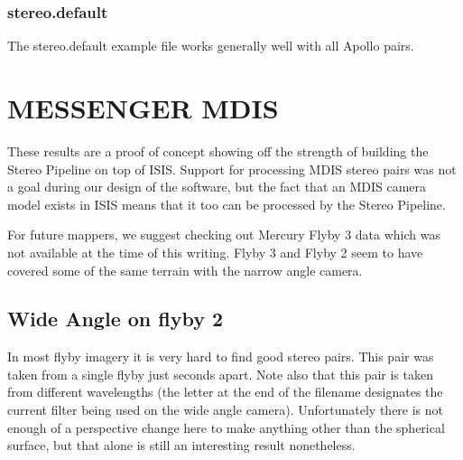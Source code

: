\subsubsection*{stereo.default}

The stereo.default example file works generally well with all Apollo pairs.

\pagebreak

\section{MESSENGER MDIS}

These results are a proof of concept showing off the strength of
building the Stereo Pipeline on top of \ac{ISIS}. Support for processing
MDIS stereo pairs was not a goal during our design of the software,
but the fact that an MDIS camera model exists in ISIS means that
it too can be processed by the Stereo Pipeline.

For future mappers, we suggest checking out Mercury Flyby 3 data which
was not available at the time of this writing. Flyby 3 and Flyby 2
seem to have covered some of the same terrain with the narrow angle
camera.

\subsection{Wide Angle on flyby 2}

In most flyby imagery it is very hard to find good stereo pairs.
This pair was taken from a single flyby just seconds apart. Note
also that this pair is taken from different wavelengths (the letter
at the end of the filename designates the current filter being used
on the wide angle camera). Unfortunately there is not enough of a
perspective change here to make anything other than the spherical
surface, but that alone is still an interesting result nonetheless.

